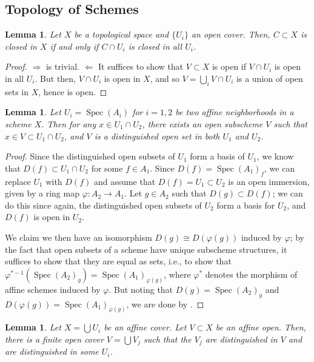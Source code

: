 \documentclass[10pt]{article}
\newtheorem{lemma}[subsubsection]{Lemma}
\theoremstyle{definition}
\theoremstyle{remark}
\numberwithin{equation}{section}
\numberwithin{figure}{subsubsection}
\DeclareMathOperator{\Spec}{Spec}
\begin{document}
\subsection{Topology of Schemes}
\begin{lemma}\label{closedlocalcond}
  Let $X$ be a topological space and $\{U_i\}$ an open cover. Then, $C \subset X$ is closed in $X$ if and only if $C \cap U_i$ is closed in all $U_i$.
\end{lemma}
\begin{proof}
  $\Rightarrow$ is trivial. $\Leftarrow$ It suffices to show that $V \subset X$ is open if $V \cap U_i$ is open in all $U_i$. But then, $V \cap U_i$ is open in $X$, and so $V = \bigcup_i V \cap U_i$ is a union of open sets in $X$, hence is open.
\end{proof}
\begin{lemma}\label{niketrick}
  Let $U_i = \Spec(A_i)$ for $i=1,2$ be two affine neighborhoods in a scheme $X$. Then for any $x \in U_1 \cap U_2$, there exists an open subscheme $V$ such that $x \in V \subset U_1 \cap U_2$, and $V$ is a distinguished open set in both $U_1$ and $U_2$.
\end{lemma}
\begin{proof}
  Since the distinguished open subsets of $U_1$ form a basis of $U_1$, we know that $D(f) \subset U_1 \cap U_2$ for some $f \in A_1$. Since $D(f) = \Spec (A_1)_f$, we can replace $U_1$ with $D(f)$ and assume that $D(f) = U_1 \subset U_2$ is an open immersion, given by a ring map $\varphi\colon A_2 \to A_1$. Let $g \in A_2$ such that $D(g) \subset D(f)$; we can do this since again, the distinguished open subsets of $U_2$ form a basis for $U_2$, and $D(f)$ is open in $U_2$.
  \par We claim we then have an isomorphism $D(g) \cong D(\varphi(g))$ induced
  by $\varphi$; by the fact that open subsets of a scheme have unique subscheme
  structures, it suffices to show that they are equal as sets, i.e., to show
  that $\varphi^{*-1}(\Spec(A_2)_g) = \Spec(A_1)_{\varphi(g)}$, where
  $\varphi^*$ denotes the morphism of affine schemes induced by $\varphi$. But
  noting that $D(g) = \Spec (A_2)_g$ and $D(\varphi(g)) =
  \Spec(A_1)_{\varphi(g)}$, we are done by \cite[Exc.\ 1.21$i$]{AM69}.
\end{proof}
\begin{lemma}\label{nikecor}
  Let $X = \bigcup U_i$ be an affine cover. Let $V \subset X$ be an affine open. Then, there is a finite open cover $V = \bigcup V_j$ such that the $V_j$ are distinguished in $V$ and are distinguished in some $U_i$.
\end{lemma}
\end{document}
